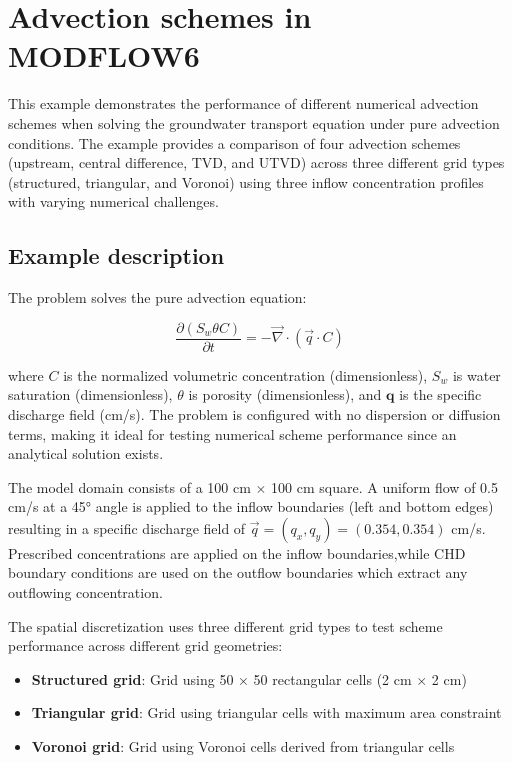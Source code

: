 \section{Advection schemes in MODFLOW6}

This example demonstrates the performance of different numerical advection schemes when solving the groundwater transport equation under pure advection conditions. The example provides a comparison of four advection schemes (upstream, central difference, TVD, and UTVD) across three different grid types (structured, triangular, and Voronoi) using three inflow concentration profiles with varying numerical challenges.

\subsection{Example description}

The problem solves the pure advection equation:

\begin{equation}
\frac{\partial \left(S_w \theta C\right)}{\partial t} = -\vec{\nabla} \cdot \left(\vec{q} \cdot C\right)
\label{eq:pureadvection}
\end{equation}

\noindent where $C$ is the normalized volumetric concentration (dimensionless), $S_w$ is water saturation (dimensionless), $\theta$ is porosity (dimensionless), and $\mathbf{q}$ is the specific discharge field (cm/s). The problem is configured with no dispersion or diffusion terms, making it ideal for testing numerical scheme performance since an analytical solution exists.

The model domain consists of a 100 cm $\times$ 100 cm square. A uniform flow of 0.5 cm/s at a 45° angle is applied to the inflow boundaries (left and bottom edges) resulting in a specific discharge field of $\vec{q} = (q_x, q_y) = (0.354, 0.354)$ cm/s. Prescribed concentrations are applied on the inflow boundaries,while CHD boundary conditions are used on the outflow boundaries which extract any outflowing concentration.

The spatial discretization uses three different grid types to test scheme performance across different grid geometries:
\begin{itemize}
\item \textbf{Structured grid}: Grid using 50 $\times$ 50 rectangular cells (2 cm $\times$ 2 cm)
\item \textbf{Triangular grid}: Grid using triangular cells with maximum area constraint
\item \textbf{Voronoi grid}: Grid using Voronoi cells derived from triangular cells
\end{itemize}


